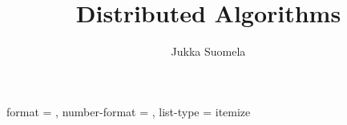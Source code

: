 

{
    format = \normalfont,
    number-format = \normalfont,
    list-type = itemize
}

\newcommand{\hint}[1]{\nopagebreak\par\hfill{\footnotesize\em $\triangleright$ hint \endnote{#1}\par}}
\newcommand{\hintnumber}[1]{#1}


\makeatletter
\renewcommand\maketitle{\begin{titlepage}
    \vspace*{\stretch{1}}
    \begin{center}
        {\Huge \@title \par}%
        \vspace{15mm}%
        {\LARGE \@author \par}%
        \vspace{3mm}
        {\large \myaffiliation \par}%
        \vspace{3mm}
        {\large \@date \par}%
        \vspace{20mm}
        {\large \mycovernote\par}
    \end{center}%
    \vspace*{\stretch{1}}
\end{titlepage}}
\makeatother

\title{Distributed Algorithms}
\author{Jukka Suomela}
\newcommand{\myaffiliation}{Aalto University, Finland}
\newcommand{\mycovernote}{%
    This is a preliminary version, \\
    see the website for updates: \\ 
    \url{http://users.ics.aalto.fi/suomela/da/}
}



\newcommand{\dinput}[1]{This chapter will be published later.}
